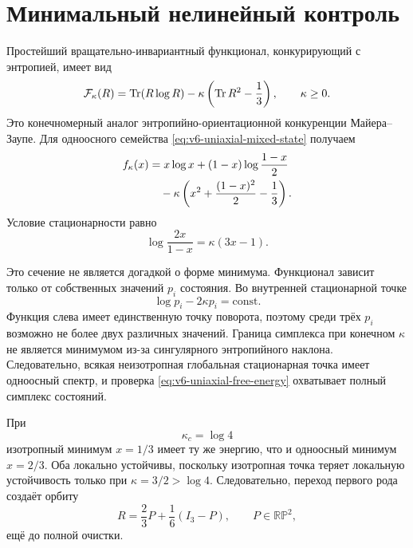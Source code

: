 \section{Минимальный нелинейный контроль}

Простейший вращательно-инвариантный функционал, конкурирующий с энтропией,
имеет вид
\begin{equation}
 \mathcal F_\kappa(R)
 =\operatorname{Tr}(R\log R)
 -\kappa\left(\operatorname{Tr} R^2-\frac13\right),
 \qquad \kappa\ge0.
 \label{eq:v6-entropy-alignment-functional}
\end{equation}
Это конечномерный аналог энтропийно-ориентационной конкуренции
Майера--Заупе. Для одноосного семейства \eqref{eq:v6-uniaxial-mixed-state}
получаем
\begin{align}
 f_\kappa(x)
 &=x\log x+(1-x)\log\frac{1-x}{2}\notag\\
 &\quad-\kappa\left(x^2+\frac{(1-x)^2}{2}-\frac13\right).
 \label{eq:v6-uniaxial-free-energy}
\end{align}
Условие стационарности равно
\begin{equation}
 \log\frac{2x}{1-x}=\kappa(3x-1).
 \label{eq:v6-uniaxial-stationarity}
\end{equation}

Это сечение не является догадкой о форме минимума. Функционал зависит
только от собственных значений $p_i$ состояния. Во внутренней стационарной
точке
\begin{equation}
 \log p_i-2\kappa p_i=\text{const}.
\end{equation}
Функция слева имеет единственную точку поворота, поэтому среди трёх
$p_i$ возможно не более двух различных значений. Граница симплекса при
конечном $\kappa$ не является минимумом из-за сингулярного энтропийного
наклона. Следовательно, всякая неизотропная глобальная стационарная точка
имеет одноосный спектр, и проверка \eqref{eq:v6-uniaxial-free-energy}
охватывает полный симплекс состояний.

При
\begin{equation}
 \boxed{\kappa_c=\log4}
 \label{eq:v6-exact-ordering-threshold}
\end{equation}
изотропный минимум $x=1/3$ имеет ту же энергию, что и одноосный минимум
$x=2/3$. Оба локально устойчивы, поскольку изотропная точка теряет
локальную устойчивость только при $\kappa=3/2>\log4$. Следовательно,
переход первого рода создаёт орбиту
\begin{equation}
 R=\frac23P+\frac16(I_3-P),\qquad P\in\mathbb{RP}^2,
 \label{eq:v6-critical-rp2-state}
\end{equation}
ещё до полной очистки.

